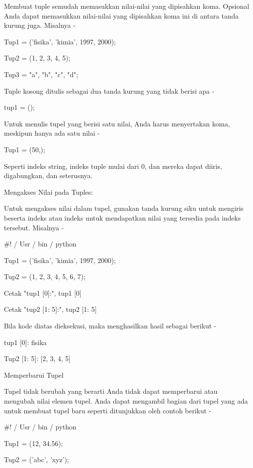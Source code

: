 Membuat tuple semudah memasukkan nilai-nilai yang dipisahkan koma. Opsional Anda dapat memasukkan nilai-nilai yang dipisahkan koma ini di antara tanda kurung juga. Misalnya - \par
\vspace{12pt}
Tup1 = ('fisika', 'kimia', 1997, 2000); \par
Tup2 = (1, 2, 3, 4, 5); \par
Tup3 = "a", "b", "c", "d"; \par
Tuple kosong ditulis sebagai dua tanda kurung yang tidak berisi apa - \par
tup1 = (); \par
Untuk menulis tupel yang berisi satu nilai, Anda harus menyertakan koma, meskipun hanya ada satu nilai - \par
Tup1 = (50,); \par
Seperti indeks string, indeks tuple mulai dari 0, dan mereka dapat diiris, digabungkan, dan seterusnya. \par
Mengakses Nilai pada Tuples: \par
Untuk mengakses nilai dalam tupel, gunakan tanda kurung siku untuk mengiris beserta indeks atau indeks untuk mendapatkan nilai yang tersedia pada indeks tersebut. Misalnya - \par
 $  \#  $! / Usr / bin / python \par
\vspace{12pt}
Tup1 = ('fisika', 'kimia', 1997, 2000); \par
Tup2 = (1, 2, 3, 4, 5, 6, 7); \par
\vspace{12pt}
Cetak "tup1 [0]:", tup1 [0] \par
Cetak "tup2 [1: 5]:", tup2 [1: 5] \par
Bila kode diatas dieksekusi, maka menghasilkan hasil sebagai berikut - \par
tup1 [0]: fisika \par
Tup2 [1: 5]: [2, 3, 4, 5] \par
Memperbarui Tupel \par
Tupel tidak berubah yang berarti Anda tidak dapat memperbarui atau mengubah nilai elemen tupel. Anda dapat mengambil bagian dari tupel yang ada untuk membuat tupel baru seperti ditunjukkan oleh contoh berikut - \par
 $  \#  $! / Usr / bin / python \par
\vspace{12pt}
Tup1 = (12, 34.56); \par
Tup2 = ('abc', 'xyz'); \par
